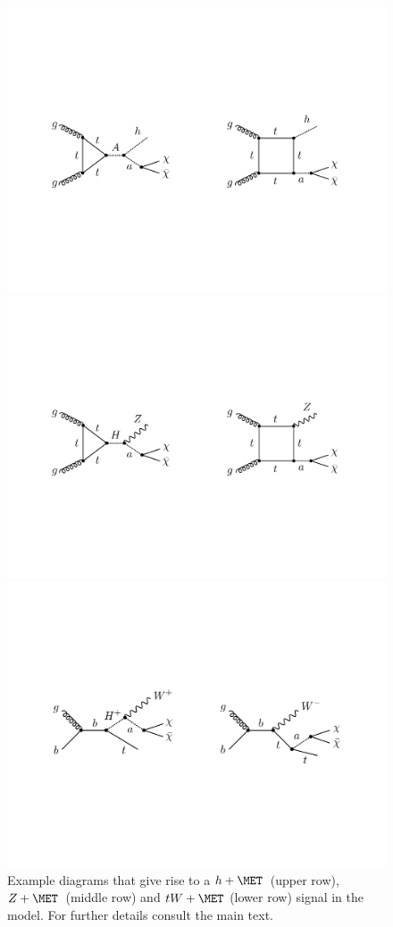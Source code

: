 \begin{figure}[t!]
\centering
\includegraphics[width=.8\textwidth]{texinputs/04_grid/newfigures/hmet.pdf}

\vspace{4mm}

\includegraphics[width=.8\textwidth]{texinputs/04_grid/newfigures/zmet.pdf}

\vspace{5mm}

\includegraphics[width=.8\textwidth]{texinputs/04_grid/newfigures/twmet.pdf}

\vspace{4mm}
\caption{\label{fig:resonant} Example diagrams that give rise to a $h+\MET$~(upper row), $Z+\MET$~(middle row) and $tW + \MET$ (lower row) signal in the \hdma model. For further details consult the main text. }
\end{figure}

